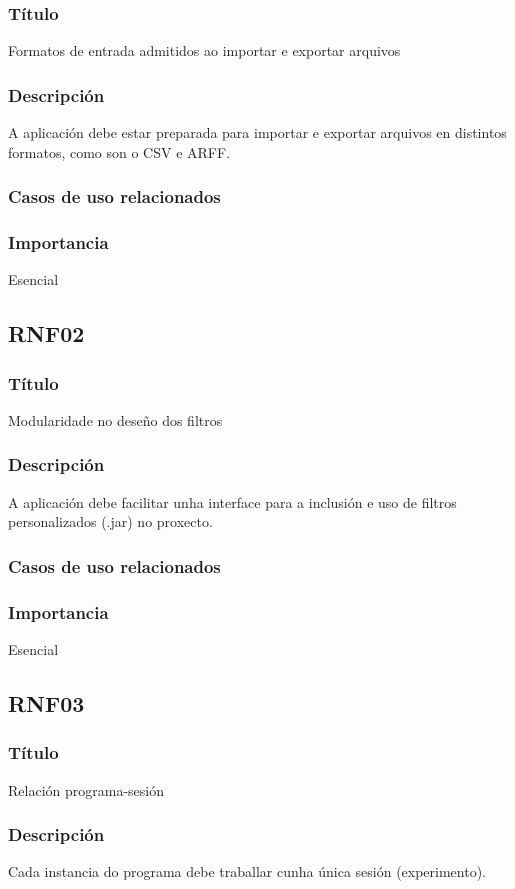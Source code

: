 \subsubsection{Título}
Formatos de entrada admitidos ao importar e exportar arquivos
\subsubsection{Descripción}
A aplicación debe estar preparada para importar e exportar arquivos en distintos formatos, como son o CSV e ARFF.
\subsubsection{Casos de uso relacionados}
\subsubsection{Importancia}
Esencial

\subsection{RNF02}
\subsubsection{Título}
Modularidade no deseño dos filtros
\subsubsection{Descripción}
A aplicación debe facilitar unha interface para a inclusión e uso de filtros personalizados (.jar) no proxecto.
\subsubsection{Casos de uso relacionados}
\subsubsection{Importancia}
Esencial

\subsection{RNF03}
\subsubsection{Título}
Relación programa-sesión
\subsubsection{Descripción}
Cada instancia do programa debe traballar cunha única sesión (experimento).
